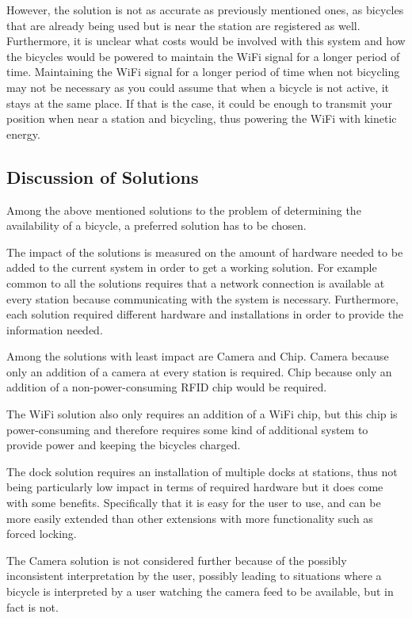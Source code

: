However, the solution is not as accurate as previously mentioned ones, as bicycles that are already being used but is near the station are registered as well.
Furthermore, it is unclear what costs would be involved with this system and how the bicycles would be powered to maintain the WiFi signal for a longer period of time. 
Maintaining the WiFi signal for a longer period of time when not bicycling may not be necessary as you could assume that when a bicycle is not active, it stays at the same place.
If that is the case, it could be enough to transmit your position when near a station and bicycling, thus powering the WiFi with kinetic energy.

\subsection{Discussion of Solutions}
Among the above mentioned solutions to the problem of determining the availability of a bicycle, a preferred solution has to be chosen. 

The impact of the solutions is measured on the amount of hardware needed to be added to the current system in order to get a working solution. 
For example common to all the solutions requires that a network connection is available at every station because communicating with the system is necessary. 
Furthermore, each solution required different hardware and installations in order to provide the information needed. 

Among the solutions with least impact are Camera and Chip. 
Camera because only an addition of a camera at every station is required. 
Chip because only an addition of a non-power-consuming RFID chip would be required.

The WiFi solution also only requires an addition of a WiFi chip, but this chip is power-consuming and therefore requires some kind of additional system to provide power and keeping the bicycles charged.

The dock solution requires an installation of multiple docks at stations, thus not being particularly low impact in terms of required hardware but it does come with some benefits.
Specifically that it is easy for the user to use, and can be more easily extended than other extensions with more functionality such as forced locking.

The Camera solution is not considered further because of the possibly inconsistent interpretation by the user, possibly leading to situations where a bicycle is interpreted by a user watching the camera feed to be available, but in fact is not.

